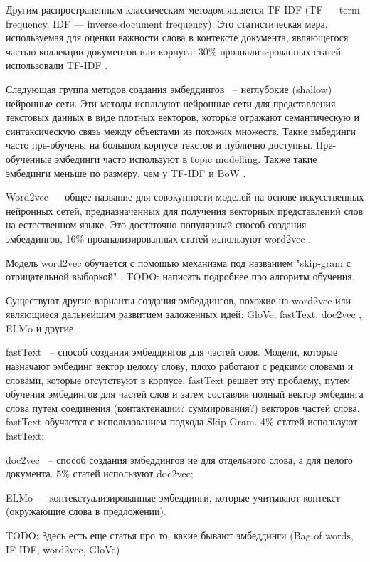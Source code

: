 Другим распространенным классическим методом является TF-IDF (TF — term frequency, IDF — inverse document frequency). Это статистическая мера, используемая для оценки важности слова в контексте документа, являющегося частью коллекции документов или корпуса. 30\% проанализированных статей использовали TF-IDF \cite{no-patterns}.

Следующая группа методов создания эмбеддингов ~-- неглубокие (shallow) нейронные сети. Эти методы испльзуют нейронные сети для представления текстовых данных в виде плотных векторов, которые отражают семантическую и синтаксическую связь между  объектами из похожих множеств. Такие эмбединги часто пре-обучены на большом корпусе текстов и публично доступны. Пре-обученные эмбединги часто используют в  topic modelling. Также такие эмбединги меньше по размеру, чем у TF-IDF и BoW \cite{no-patterns}.

Word2vec ~-- общее название для совокупности моделей на основе искусственных нейронных сетей, предназначенных для получения векторных представлений слов на естественном языке. Это достаточно популярный способ создания эмбеддингов, 16\% проанализированных статей используют word2vec \cite{no-patterns}.

Модель word2vec обучается с помощью механизма под названием "skip-gram с отрицательной выборкой" \cite{word2vec-habr}. TODO: написать подробнее про алгоритм обучения.

Существуют другие варианты создания эмбеддингов, похожие на word2vec или являющиеся дальнейшим развитием заложенных идей: GloVe, fastText, doc2vec \cite{no-patterns}, ELMo и другие.

fastText ~-- способ создания эмбеддингов для частей слов. Модели, которые назначают эмбединг вектор целому слову, плохо работают с редкими словами  и словами, которые отсутствуют в корпусе. fastText решает эту проблему, путем обучения эмбедингов для частей слов и затем составляя полный вектор эмбединга слова путем соединения (контактенации? суммирования?) векторов частей слова. fastText обучается с использованием подхода Skip-Gram. 4\% статей \cite{no-patterns} используют fastText;

doc2vec ~-- способ создания эмбеддингов не для отдельного слова, а для целого документа. 5\% статей \cite{no-patterns} используют doc2vec;

ELMo ~-- контекстуализированные эмбеддинги, которые учитывают контекст (окружающие слова в предложении).

TODO: Здесь \cite{embeddings-habr} есть еще статья про то, какие бывают эмбеддинги (Bag of words, IF-IDF, word2vec, GloVe)

